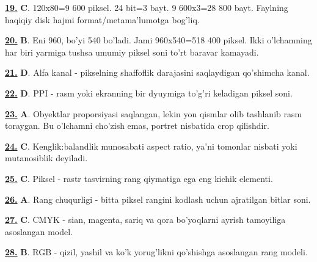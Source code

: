 \documentclass[10pt,a4paper,oneside]{article}
\begin{document}
\noindent\hyperlink{q19}{\textbf{19.}} \textbf{C}.  120x80=9 600 piksel. 24 bit=3 bayt. 9 600x3=28 800 bayt. Faylning haqiqiy disk hajmi format/metama'lumotga bog'liq.
\par\vspace{3mm}
\noindent\hyperlink{q20}{\textbf{20.}} \textbf{B}.  Eni 960, bo'yi 540 bo'ladi. Jami 960x540=518 400 piksel. Ikki o'lchamning har biri yarmiga tushsa umumiy piksel soni to'rt baravar kamayadi.
\par\vspace{3mm}
\noindent\hyperlink{q21}{\textbf{21.}} \textbf{D}.  Alfa kanal - pikselning shaffoflik darajasini saqlaydigan qo'shimcha kanal.
\par\vspace{3mm}
\noindent\hyperlink{q22}{\textbf{22.}} \textbf{D}.  PPI - rasm yoki ekranning bir dyuymiga to'g'ri keladigan piksel soni.
\par\vspace{3mm}
\noindent\hyperlink{q23}{\textbf{23.}} \textbf{A}.  Obyektlar proporsiyasi saqlangan, lekin yon qismlar olib tashlanib rasm toraygan. Bu o'lchamni cho'zish emas, portret nisbatida crop qilishdir.
\par\vspace{3mm}
\noindent\hyperlink{q24}{\textbf{24.}} \textbf{C}.  Kenglik:balandlik munosabati aspect ratio, ya'ni tomonlar nisbati yoki mutanosiblik deyiladi.
\par\vspace{3mm}
\noindent\hyperlink{q25}{\textbf{25.}} \textbf{C}.  Piksel - rastr tasvirning rang qiymatiga ega eng kichik elementi.
\par\vspace{3mm}
\noindent\hyperlink{q26}{\textbf{26.}} \textbf{A}.  Rang chuqurligi - bitta piksel rangini kodlash uchun ajratilgan bitlar soni.
\par\vspace{3mm}
\noindent\hyperlink{q27}{\textbf{27.}} \textbf{C}.  CMYK - sian, magenta, sariq va qora bo'yoqlarni ayrish tamoyiliga asoslangan model.
\par\vspace{3mm}
\noindent\hyperlink{q28}{\textbf{28.}} \textbf{B}.  RGB - qizil, yashil va ko'k yorug'likni qo'shishga asoslangan rang modeli.
\end{document}
